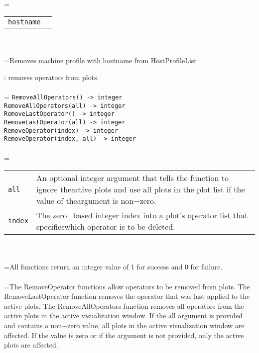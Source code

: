 \documentclass[10pt,a4paper]{report}
\begin{document}
 \\ 
\hangindent=\parindent 
\begin{tabular}{ll}
\verb!hostname! &  \\
\end{tabular} \\[-2mm]


 \\ 
\hangindent=\parindent Removes machine profile with hostname from HostProfileList \\[-3mm] 

\newpage


{}
: removes operators from plots.\\[-3mm]

 \\ 
\hangindent=\parindent 
\verb!RemoveAllOperators() -> integer!\\ 
\verb!RemoveAllOperators(all) -> integer!\\ 
\verb!RemoveLastOperator() -> integer!\\ 
\verb!RemoveLastOperator(all) -> integer!\\ 
\verb!RemoveOperator(index) -> integer!\\ 
\verb!RemoveOperator(index, all) -> integer!\\ [-3mm]

 \\ 
\hangindent=\parindent 
\begin{tabular}{lp{9cm}}
\verb!all! & An optional integer argument that tells the function to ignore theactive plots and use all plots in the plot list if the value of theargument is non$-$zero. \\
\verb!index! & The zero$-$based integer index into a plot's operator list that specifieswhich operator is to be deleted. \\
\end{tabular} \\[-2mm]


 \\ 
\hangindent=\parindent All functions return an integer value of 1 for success and 0 for failure. \\[-3mm] 

 \\ 
\hangindent=\parindent The RemoveOperator functions allow operators to be removed from plots. The RemoveLastOperator function removes the operator that was last applied to the active plots. The RemoveAllOperators function removes all operators from the active plots in the active visualization window. If the all argument is provided and contains a non$-$zero value, all plots in the active visualization window are affected. If the value is zero or if the argument is not provided, only the active plots are affected. \\[-3mm] 
\end{document}
